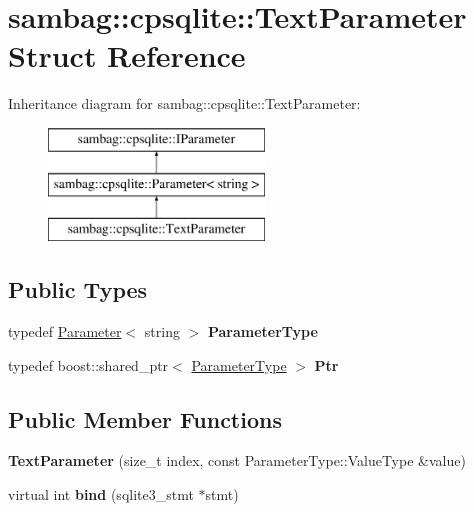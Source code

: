\hypertarget{structsambag_1_1cpsqlite_1_1_text_parameter}{
\section{sambag::cpsqlite::TextParameter Struct Reference}
\label{structsambag_1_1cpsqlite_1_1_text_parameter}
}
Inheritance diagram for sambag::cpsqlite::TextParameter:\begin{figure}[H]
\begin{center}
\leavevmode
\includegraphics[height=3.000000cm]{structsambag_1_1cpsqlite_1_1_text_parameter}
\end{center}
\end{figure}
\subsection*{Public Types}
\begin{DoxyCompactItemize}
\item 
\hypertarget{structsambag_1_1cpsqlite_1_1_text_parameter_ae6cf42baee96468f195087261acd2a43}{
typedef \hyperlink{structsambag_1_1cpsqlite_1_1_parameter}{Parameter}$<$ string $>$ {\bfseries ParameterType}}
\label{structsambag_1_1cpsqlite_1_1_text_parameter_ae6cf42baee96468f195087261acd2a43}

\item 
\hypertarget{structsambag_1_1cpsqlite_1_1_text_parameter_ad9847de930b3c3bb34cebd4b61e16391}{
typedef boost::shared\_\-ptr$<$ \hyperlink{structsambag_1_1cpsqlite_1_1_parameter}{ParameterType} $>$ {\bfseries Ptr}}
\label{structsambag_1_1cpsqlite_1_1_text_parameter_ad9847de930b3c3bb34cebd4b61e16391}

\end{DoxyCompactItemize}
\subsection*{Public Member Functions}
\begin{DoxyCompactItemize}
\item 
\hypertarget{structsambag_1_1cpsqlite_1_1_text_parameter_aa4f6b6c381502785636702325276fd19}{
{\bfseries TextParameter} (size\_\-t index, const ParameterType::ValueType \&value)}
\label{structsambag_1_1cpsqlite_1_1_text_parameter_aa4f6b6c381502785636702325276fd19}

\item 
\hypertarget{structsambag_1_1cpsqlite_1_1_text_parameter_ac4f2fb1361cbba2910a1b679322bf96c}{
virtual int {\bfseries bind} (sqlite3\_\-stmt $\ast$stmt)}
\label{structsambag_1_1cpsqlite_1_1_text_parameter_ac4f2fb1361cbba2910a1b679322bf96c}

\end{DoxyCompactItemize}
